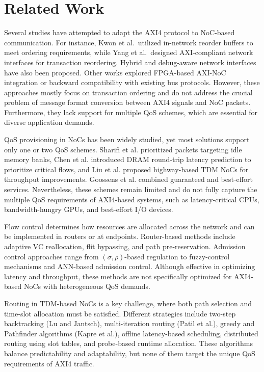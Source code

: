 \section{Related Work}

Several studies have attempted to adapt the AXI4 protocol to NoC-based communication. For instance, Kwon et al.\ utilized in-network reorder buffers to meet ordering requirements, while Yang et al.\ designed AXI-compliant network interfaces for transaction reordering. Hybrid and debug-aware network interfaces have also been proposed. 
Other works explored FPGA-based AXI-NoC integration or backward compatibility with existing bus protocols. However, these approaches mostly focus on transaction ordering and do not address the crucial problem of message format conversion between AXI4 signals and NoC packets. Furthermore, they lack support for multiple QoS schemes, which are essential for diverse application demands. 


QoS provisioning in NoCs has been widely studied, yet most solutions 
support only one or two QoS schemes. Sharifi et al. prioritized packets targeting idle memory banks, Chen et al. introduced DRAM round-trip latency prediction to prioritize critical flows, and Liu et al. proposed highway-based TDM NoCs for throughput improvements. Goossens et al. combined guaranteed and best-effort services. Nevertheless, these schemes remain limited and do not fully capture the multiple QoS requirements of AXI4-based systems, such as latency-critical CPUs, bandwidth-hungry GPUs, and best-effort I/O devices. 


Flow control determines how resources are allocated across the network and can be implemented in routers or at endpoints. Router-based methods include adaptive VC reallocation, flit bypassing, and path pre-reservation. Admission control approaches range from $(\sigma,\rho)$-based regulation to fuzzy-control mechanisms and ANN-based admission control. Although effective in optimizing latency and throughput, these methods are not specifically optimized for AXI4-based NoCs with heterogeneous QoS demands. 


Routing in TDM-based NoCs is a key challenge, where both path selection and time-slot allocation must be satisfied. Different strategies include two-step backtracking (Lu and Jantsch), multi-iteration routing (Patil et al.), greedy and Pathfinder algorithms (Kapre et al.), offline latency-based scheduling, distributed routing using slot tables, and probe-based runtime allocation. These algorithms balance predictability and adaptability, but none of them target the unique QoS requirements of AXI4 traffic. 


